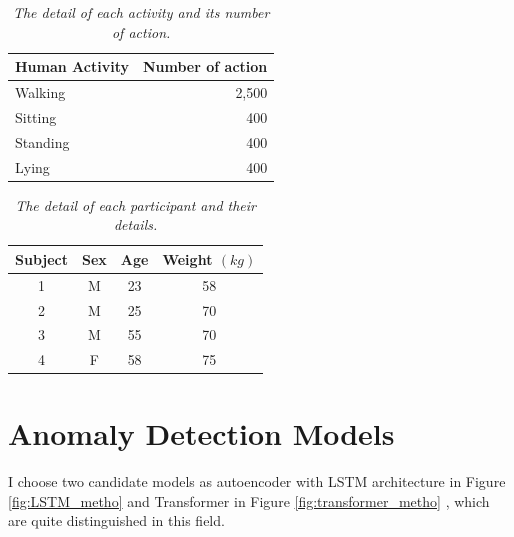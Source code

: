 \begin{table}[H]
\begin{center}
\caption[The detail of each activity and its number of action.]{\emph{The detail of each activity and its number of action.} \\ \hspace{\textwidth}}\label{tab:number_action}
\begin{tabular}{ l r }
  \textbf{Human Activity} & \textbf{Number of action}\\
\hline
Walking & 2,500 \\
\hline
Sitting & 400 \\
\hline
Standing & 400 \\
\hline
Lying & 400 \\
\hline
   \end{tabular}
\end{center}
 \end{table}
 
\begin{table}[H]
\begin{center}
\caption[The detail of each participant and their details.
]{\emph{The detail of each participant and their details.} 
\\ \hspace{\textwidth}}\label{tab:participants}
\begin{tabular}{c c c c}
  \textbf{Subject} & \textbf{Sex} &  \textbf{Age} & \textbf{Weight $(kg)$}  \\
\hline

1 & M & 23  & 58 \\
\hline

2 & M & 25  & 70 \\
\hline

3 & M & 55  & 70 \\
\hline

4 & F & 58  & 75 \\
\hline

   \end{tabular}
\end{center}
 \end{table}
 
\section{Anomaly Detection Models}
\paragraph{}
I choose two candidate models as autoencoder with LSTM architecture in Figure \ref{fig:LSTM_metho} and Transformer in Figure \ref{fig:transformer_metho} , which are quite distinguished in this field.

